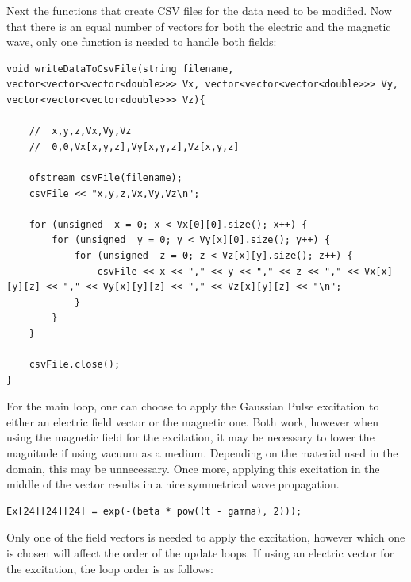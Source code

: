 Next the functions that create CSV files for the data need to be modified. Now that there is an equal number of vectors for both the electric and the magnetic wave, only one function is needed to handle both fields:

\begin{verbatim}
void writeDataToCsvFile(string filename, vector<vector<vector<double>>> Vx, vector<vector<vector<double>>> Vy, vector<vector<vector<double>>> Vz){
	
	//	x,y,z,Vx,Vy,Vz
	//	0,0,Vx[x,y,z],Vy[x,y,z],Vz[x,y,z]
	
	ofstream csvFile(filename);
	csvFile << "x,y,z,Vx,Vy,Vz\n";
	
	for (unsigned  x = 0; x < Vx[0][0].size(); x++) {
		for (unsigned  y = 0; y < Vy[x][0].size(); y++) {
			for (unsigned  z = 0; z < Vz[x][y].size(); z++) {
				csvFile << x << "," << y << "," << z << "," << Vx[x][y][z] << "," << Vy[x][y][z] << "," << Vz[x][y][z] << "\n";
			}
		}
	}
	
	csvFile.close();
}
\end{verbatim}

For the main loop, one can choose to apply the Gaussian Pulse excitation to either an electric field vector or the magnetic one. Both work, however when using the magnetic field for the excitation, it may be necessary to lower the magnitude if using vacuum as a medium. Depending on the material used in the domain, this may be unnecessary. Once more, applying this excitation in the middle of the vector results in a nice symmetrical wave propagation.

\begin{verbatim}
Ex[24][24][24] = exp(-(beta * pow((t - gamma), 2)));
\end{verbatim}

Only one of the field vectors is needed to apply the excitation, however which one is chosen will affect the order of the update loops. If using an electric vector for the excitation, the loop order is as follows:

